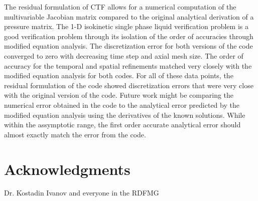 \documentclass{mc2015}
\begin{document}
The residual formulation of CTF allows for a numerical computation of the
multivariable Jacobian matrix compared to the original analytical derivation of
a pressure matrix. The 1-D isokinetic single phase liquid verification problem
is a good verification problem through its isolation of the order
of accuracies through modified equation analysis. The discretization error for
both versions of the code converged to zero with decreasing time step and axial
mesh size. The order of accuracy for the temporal and spatial refinements
matched very closely with the modified equation analysis for both codes. For all
of these data points, the residual formulation of the code showed discretization
errors that were very close with the original version of the code. Future work
might be comparing the numerical error obtained in the code to the analytical
error predicted by the modified equation analysis using the derivatives of the
known solutions. While within the assymptotic range, the first order accurate
analytical error should almost exactly match the error from the code.

\section{Acknowledgments}

Dr. Kostadin Ivanov and everyone in the RDFMG

\setlength{\baselineskip}{12pt}





\end{document}
